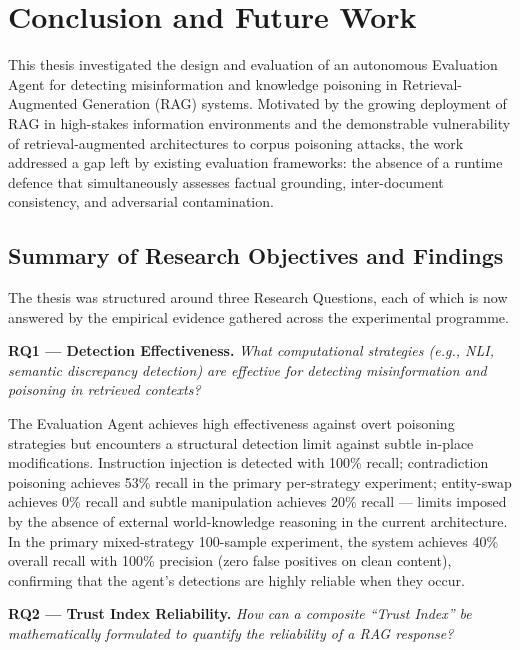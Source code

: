 \chapter{Conclusion and Future Work}
\label{ch8_conclusion}

This thesis investigated the design and evaluation of an autonomous Evaluation Agent for detecting misinformation and knowledge poisoning in Retrieval-Augmented Generation (RAG) systems. Motivated by the growing deployment of RAG in high-stakes information environments and the demonstrable vulnerability of retrieval-augmented architectures to corpus poisoning attacks, the work addressed a gap left by existing evaluation frameworks: the absence of a runtime defence that simultaneously assesses factual grounding, inter-document consistency, and adversarial contamination.

\section{Summary of Research Objectives and Findings}
\label{sec:conc_summary}

The thesis was structured around three Research Questions, each of which is now answered by the empirical evidence gathered across the experimental programme.

\textbf{RQ1 — Detection Effectiveness.}
\textit{What computational strategies (e.g., NLI, semantic discrepancy detection) are effective for detecting misinformation and poisoning in retrieved contexts?}

The Evaluation Agent achieves high effectiveness against overt poisoning strategies but encounters a structural detection limit against subtle in-place modifications. Instruction injection is detected with 100\% recall; contradiction poisoning achieves 53\% recall in the primary per-strategy experiment; entity-swap achieves 0\% recall and subtle manipulation achieves 20\% recall --- limits imposed by the absence of external world-knowledge reasoning in the current architecture. In the primary mixed-strategy 100-sample experiment, the system achieves 40\% overall recall with 100\% precision (zero false positives on clean content), confirming that the agent's detections are highly reliable when they occur.

\textbf{RQ2 — Trust Index Reliability.}
\textit{How can a composite ``Trust Index'' be mathematically formulated to quantify the reliability of a RAG response?}

